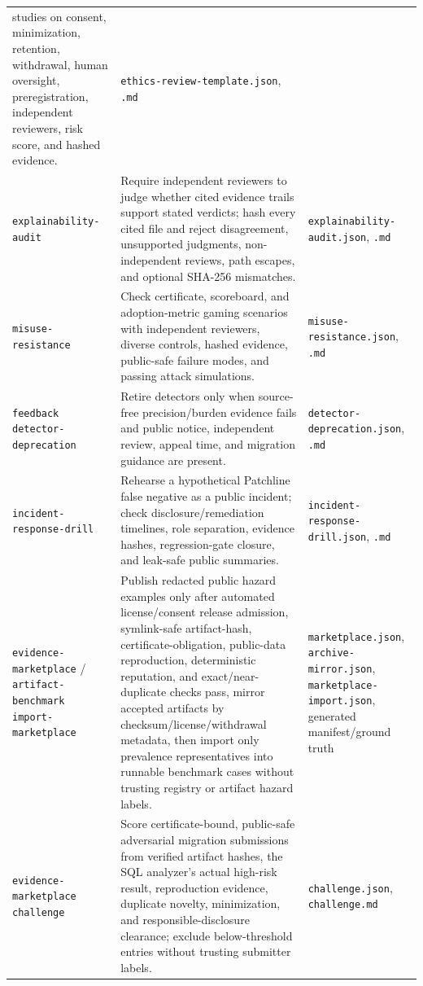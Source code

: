 \documentclass[11pt]{article}
\newcommand{\code}[1]{\texttt{#1}}
\begin{document}
\begin{longtable}{>{\raggedright\arraybackslash}p{2.3cm}>{\raggedright\arraybackslash}p{8.2cm}>{\raggedright\arraybackslash}p{3.4cm}}
studies on consent, minimization, retention, withdrawal, human oversight, preregistration, independent
reviewers, risk score, and hashed evidence. & \code{ethics-review-template.json}, \code{.md} \\
\code{explainability-audit} & Require independent reviewers to judge whether cited evidence trails
support stated verdicts; hash every cited file and reject disagreement, unsupported judgments, non-independent
reviews, path escapes, and optional SHA-256 mismatches. & \code{explainability-audit.json}, \code{.md} \\
\code{misuse-resistance} & Check certificate, scoreboard, and adoption-metric gaming scenarios with
independent reviewers, diverse controls, hashed evidence, public-safe failure modes, and passing attack
simulations. & \code{misuse-resistance.json}, \code{.md} \\
\code{feedback detector-deprecation} & Retire detectors only when source-free precision/burden evidence
fails and public notice, independent review, appeal time, and migration guidance are present. &
\code{detector-deprecation.json}, \code{.md} \\
\code{incident-response-drill} & Rehearse a hypothetical Patchline false negative as a public incident;
check disclosure/remediation timelines, role separation, evidence hashes, regression-gate closure, and
leak-safe public summaries. & \code{incident-response-drill.json}, \code{.md} \\
\code{evidence-marketplace} / \code{artifact-benchmark import-marketplace} & Publish redacted public
hazard examples only after automated license/consent release admission, symlink-safe artifact-hash,
certificate-obligation, public-data reproduction, deterministic reputation, and exact/near-duplicate
checks pass, mirror accepted artifacts by checksum/license/withdrawal metadata, then import only
prevalence representatives into runnable benchmark cases without trusting registry or artifact hazard
labels. &
\code{marketplace.json},
\code{archive-mirror.json}, \code{marketplace-import.json}, generated manifest/ground truth \\
\code{evidence-marketplace challenge} & Score certificate-bound, public-safe adversarial migration
submissions from verified artifact hashes, the SQL analyzer's actual high-risk result, reproduction
evidence, duplicate novelty, minimization, and responsible-disclosure clearance; exclude below-threshold
entries without trusting submitter labels. & \code{challenge.json}, \code{challenge.md} \\

\end{longtable}
\end{document}
